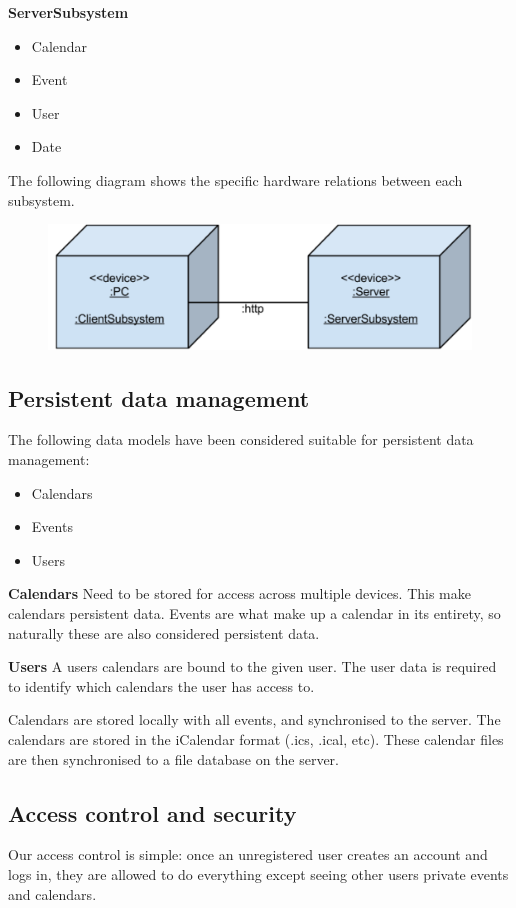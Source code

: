 \documentclass[10pt]{report}
\numberwithin{equation}{section} %
\numberwithin{figure}{section} %
\numberwithin{table}{section} %
\begin{document}
\textbf{ServerSubsystem}
\begin{itemize}
\item Calendar
\item Event
\item User
\item Date
\end{itemize}

The following diagram shows the specific hardware relations between each
subsystem.
\begin{figure}[H]
  \includegraphics[scale=0.7]{figures/components.png}
\end{figure}

\subsection{Persistent data management}
The following data models have been considered suitable for persistent data
management:
\begin{itemize}
\item Calendars
\item Events
\item Users
\end{itemize}

\textbf{Calendars}  Need to be stored for access across multiple devices. This make
calendars persistent data. Events are what make up a calendar in its entirety,
so naturally these are also considered persistent data.


\textbf{Users} A users calendars are bound to the given user. The user data is required
to identify which calendars the user has access to.


Calendars are stored locally with all events, and synchronised to the
server. The calendars are stored in the iCalendar format (.ics, .ical,
etc). These calendar files are then synchronised to a file database on the
server.

\subsection{Access control and security}
Our access control is simple: once an unregistered user creates an account and
logs in, they are allowed to do everything except seeing other users private
events and calendars.
\end{document}
